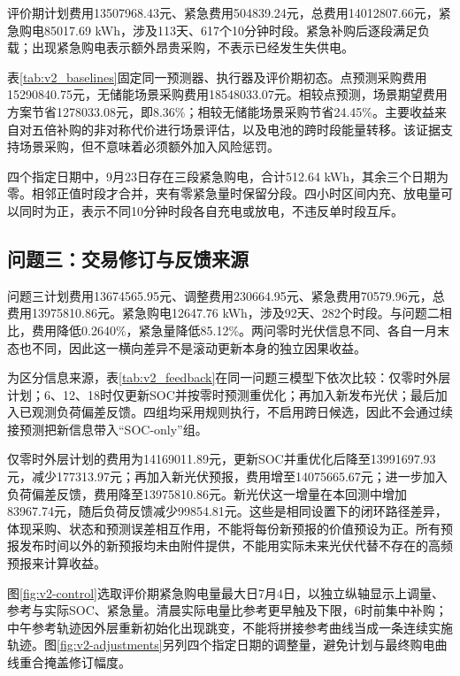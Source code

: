 评价期计划费用13507968.43元、紧急费用504839.24元，总费用14012807.66元，紧急购电85017.69 kWh，涉及113天、617个10分钟时段。紧急补购后逐段满足负载；出现紧急购电表示额外昂贵采购，不表示已经发生失供电。

表\ref{tab:v2_baselines}固定同一预测器、执行器及评价期初态。点预测采购费用15290840.75元，无储能场景采购费用18548033.07元。相较点预测，场景期望费用方案节省1278033.08元，即8.36\%；相较无储能场景采购节省24.45\%。主要收益来自对五倍补购的非对称代价进行场景评估，以及电池的跨时段能量转移。该证据支持场景采购，但不意味着必须额外加入风险惩罚。




四个指定日期中，9月23日存在三段紧急购电，合计512.64 kWh，其余三个日期为零。相邻正值时段才合并，夹有零紧急量时保留分段。四小时区间内充、放电量可以同时为正，表示不同10分钟时段各自充电或放电，不违反单时段互斥。
\FloatBarrier

\subsection{问题三：交易修订与反馈来源}

问题三计划费用13674565.95元、调整费用230664.95元、紧急费用70579.96元，总费用13975810.86元。紧急购电12647.76 kWh，涉及92天、282个时段。与问题二相比，费用降低0.2640\%，紧急量降低85.12\%。两问零时光伏信息不同、各自一月末态也不同，因此这一横向差异不是滚动更新本身的独立因果收益。

为区分信息来源，表\ref{tab:v2_feedback}在同一问题三模型下依次比较：仅零时外层计划；6、12、18时仅更新SOC并按零时预测重优化；再加入新发布光伏；最后加入已观测负荷偏差反馈。四组均采用规则执行，不启用跨日候选，因此不会通过续接预测把新信息带入“SOC-only”组。



仅零时外层计划的费用为14169011.89元，更新SOC并重优化后降至13991697.93元，减少177313.97元；再加入新光伏预报，费用增至14075665.67元；进一步加入负荷偏差反馈，费用降至13975810.86元。新光伏这一增量在本回测中增加83967.74元，随后负荷反馈减少99854.81元。这些是相同设置下的闭环路径差异，体现采购、状态和预测误差相互作用，不能将每份新预报的价值预设为正。所有预报发布时间以外的新预报均未由附件提供，不能用实际未来光伏代替不存在的高频预报来计算收益。

图\ref{fig:v2-control}选取评价期紧急购电量最大日7月4日，以独立纵轴显示上调量、参考与实际SOC、紧急量。清晨实际电量比参考更早触及下限，6时前集中补购；中午参考轨迹因外层重新初始化出现跳变，不能将拼接参考曲线当成一条连续实施轨迹。图\ref{fig:v2-adjustments}另列四个指定日期的调整量，避免计划与最终购电曲线重合掩盖修订幅度。

